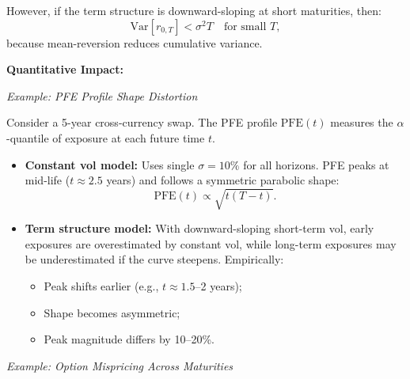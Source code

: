 However, if the term structure is downward-sloping at short maturities, then:
\begin{equation}
	\text{Var}[r_{0,T}] < \sigma^2 T \quad \text{for small } T,
\end{equation}
because mean-reversion reduces cumulative variance.

\textbf{Quantitative Impact:}

\textit{Example: PFE Profile Shape Distortion}

Consider a 5-year cross-currency swap. The PFE profile $\text{PFE}(t)$ measures the $\alpha$-quantile of exposure at each future time $t$.

\begin{itemize}
	\item \textbf{Constant vol model:} Uses single $\sigma = 10\%$ for all horizons. PFE peaks at mid-life ($t \approx 2.5$ years) and follows a symmetric parabolic shape:
	\begin{equation}
		\text{PFE}(t) \propto \sqrt{t(T-t)}.
	\end{equation}
	
	\item \textbf{Term structure model:} With downward-sloping short-term vol, early exposures are overestimated by constant vol, while long-term exposures may be underestimated if the curve steepens. Empirically:
	\begin{itemize}
		\item Peak shifts earlier (e.g., $t \approx 1.5$--2 years);
		\item Shape becomes asymmetric;
		\item Peak magnitude differs by 10--20\%.
	\end{itemize}
\end{itemize}

\textit{Example: Option Mispricing Across Maturities}

